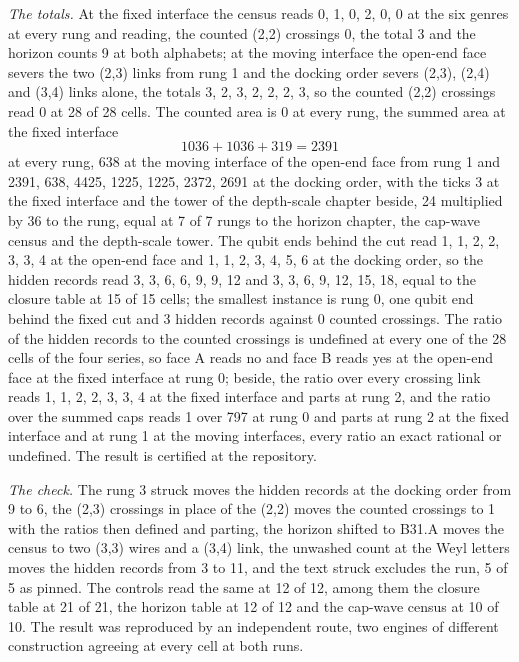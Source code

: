 \begin{chproof}
\textit{The totals.} At the fixed interface the census reads 0, 1, 0, 2, 0, 0 at the six genres at every rung and reading, the counted (2,2) crossings 0, the total 3 and the horizon counts 9 at both alphabets; at the moving interface the open-end face severs the two (2,3) links from rung 1 and the docking order severs (2,3), (2,4) and (3,4) links alone, the totals 3, 2, 3, 2, 2, 2, 3, so the counted (2,2) crossings read 0 at 28 of 28 cells. The counted area is 0 at every rung, the summed area at the fixed interface
\begin{equation}
1036 + 1036 + 319 = 2391
\end{equation}
at every rung, 638 at the moving interface of the open-end face from rung 1 and 2391, 638, 4425, 1225, 1225, 2372, 2691 at the docking order, with the ticks 3 at the fixed interface and the tower of the depth-scale chapter beside, 24 multiplied by 36 to the rung, equal at 7 of 7 rungs to the horizon chapter, the cap-wave census and the depth-scale tower. The qubit ends behind the cut read 1, 1, 2, 2, 3, 3, 4 at the open-end face and 1, 1, 2, 3, 4, 5, 6 at the docking order, so the hidden records read 3, 3, 6, 6, 9, 9, 12 and 3, 3, 6, 9, 12, 15, 18, equal to the closure table at 15 of 15 cells; the smallest instance is rung 0, one qubit end behind the fixed cut and 3 hidden records against 0 counted crossings. The ratio of the hidden records to the counted crossings is undefined at every one of the 28 cells of the four series, so face A reads no and face B reads yes at the open-end face at the fixed interface at rung 0; beside, the ratio over every crossing link reads 1, 1, 2, 2, 3, 3, 4 at the fixed interface and parts at rung 2, and the ratio over the summed caps reads 1 over 797 at rung 0 and parts at rung 2 at the fixed interface and at rung 1 at the moving interfaces, every ratio an exact rational or undefined. The result is certified at the repository.

\textit{The check.} The rung 3 struck moves the hidden records at the docking order from 9 to 6, the (2,3) crossings in place of the (2,2) moves the counted crossings to 1 with the ratios then defined and parting, the horizon shifted to B31.A moves the census to two (3,3) wires and a (3,4) link, the unwashed count at the Weyl letters moves the hidden records from 3 to 11, and the text struck excludes the run, 5 of 5 as pinned. The controls read the same at 12 of 12, among them the closure table at 21 of 21, the horizon table at 12 of 12 and the cap-wave census at 10 of 10. The result was reproduced by an independent route, two engines of different construction agreeing at every cell at both runs.
\end{chproof}
